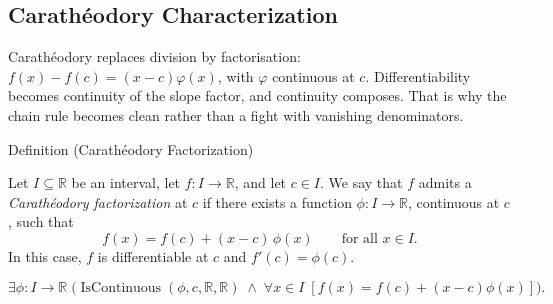 \subsection{Carath\'{e}odory Characterization}


\begin{remark*}[Interpretation]
Carath\'{e}odory replaces division by factorisation:
\(f(x)-f(c)=(x-c)\varphi(x)\), with \(\varphi\) continuous at \(c\).
Differentiability becomes continuity of the slope factor, and continuity
composes. That is why the chain rule becomes clean rather than a fight with
vanishing denominators.
\end{remark*}

\begin{definitionbox}{Definition (Carath\'{e}odory Factorization)}
\begin{definition}
\label{def:caratheodory-factorization}
Let $I \subseteq \mathbb{R}$ be an interval, let $f : I \to \mathbb{R}$, and let $c \in I$. We say that $f$ admits a \emph{Carath\'{e}odory factorization} at $c$ if there exists a function $\phi : I \to \mathbb{R}$, continuous at $c$, such that
\[
f(x) = f(c) + (x-c)\,\phi(x) \qquad \text{for all } x \in I.
\]
In this case, $f$ is differentiable at $c$ and $f'(c) = \phi(c)$.
\end{definition}
\end{definitionbox}

\begin{remark*}
\[
\exists \phi : I \to \mathbb{R}\;
\bigl(\operatorname{IsContinuous}(\phi,c,\mathbb{R},\mathbb{R})
\;\land\;
\forall x \in I\;[f(x) = f(c)+(x-c)\phi(x)]\bigr).
\]
\end{remark*}

